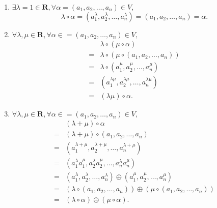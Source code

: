 \begin{solution}
\begin{enumerate}
\begin{enumerate}
                    \item $\exists \lambda = 1 \in \mathbf{R}, \forall \alpha = (a_1, a_2, \ldots, a_n) \in V,$
                    \[\lambda \circ \alpha = (a_1^\lambda, a_2^\lambda, \ldots, a_n^\lambda) = (a_1, a_2, \ldots, a_n) = \alpha.\]

                    \item $\forall \lambda, \mu \in \mathbf{R}, \forall \alpha \in = (a_1, a_2, \ldots, a_n) \in V,$
                    \begin{align*}
                        & \lambda \circ(\mu \circ \alpha) \\ ={} & \lambda \circ(\mu \circ (a_1, a_2, \ldots, a_n)) \\ ={} & \lambda \circ (a_1^\mu, a_2^\mu, \ldots, a_n^\mu) \\ ={} & (a_1^{\lambda\mu}, a_2^{\lambda\mu}, \ldots, a_n^{\lambda\mu}) \\ ={} & (\lambda \mu)\circ \alpha.
                    \end{align*}

                    \item $\forall \lambda, \mu \in \mathbf{R}, \forall \alpha \in = (a_1, a_2, \ldots, a_n) \in V,$
                    \begin{align*}
                        & (\lambda + \mu) \circ \alpha \\ ={} & (\lambda + \mu) \circ (a_1, a_2, \ldots, a_n) \\ ={} & (a_1^{\lambda + \mu}, a_2^{\lambda + \mu}, \ldots, a_n^{\lambda + \mu}) \\ ={} & (a_1^\lambda a_1^\mu, a_2^\lambda a_2^\mu, \ldots, a_n^\lambda a_n^\mu) \\ ={} & (a_1^\lambda, a_2^\lambda, \ldots, a_n^\lambda) \oplus (a_1^\mu, a_2^\mu, \ldots, a_n^\mu) \\ ={} & (\lambda \circ (a_1, a_2, \ldots, a_n)) \oplus (\mu \circ (a_1, a_2, \ldots, a_n)) \\ ={} & (\lambda \circ \alpha) \oplus (\mu \circ \alpha).
                    \end{align*}


\end{enumerate}
\end{enumerate}
\end{solution}
